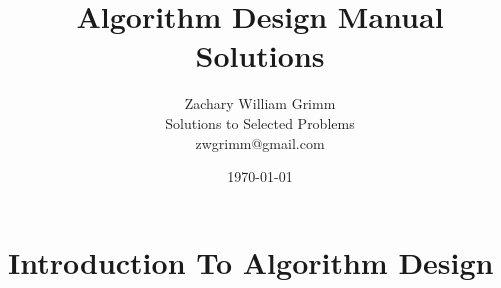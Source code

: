 \documentclass[12pt,fleqn,leqno,letterpaper]{article}
\title{Algorithm Design Manual Solutions}
\author{Zachary William Grimm\\
  \small{Solutions to Selected Problems}\\
  \small{zwgrimm@gmail.com}
}
\date{\today{}}
\begin{document}
\maketitle

\tableofcontents{}



\section{Introduction To Algorithm Design}





% 
\end{document}
